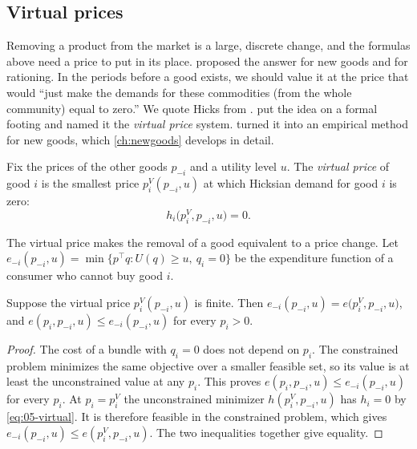 \subsection{Virtual prices}\label{sec:05-welfare-virtual}

Removing a product from the market is a large, discrete change, and the formulas above need a price to put in
its place. \citet{Hicks1940} proposed the answer for new goods and for rationing. In the periods before a good
exists, we should value it at the price that would ``just make the demands for these commodities (from the whole
community) equal to zero.'' We quote Hicks from \citet[p.~211]{Hausman1997}. \citet{Rothbarth1941} put the
idea on a formal footing and named it the \emph{virtual price} system. \citet{Hausman1997} turned it into an
empirical method for new goods, which \cref{ch:newgoods} develops in detail.

\begin{definition}\label{def:05-virtual}
Fix the prices of the other goods $p_{-i}$ and a utility level $u$. The \emph{virtual price} of good $i$ is the
smallest price $p_i^V(p_{-i},u)$ at which Hicksian demand for good $i$ is zero:
\begin{equation}\label{eq:05-virtual}
  h_i\bigl(p_i^V, p_{-i}, u\bigr) = 0.
\end{equation}
\end{definition}

The virtual price makes the removal of a good equivalent to a price change. Let
$e_{-i}(p_{-i},u) = \min\{p^\top q : U(q) \ge u,\ q_i = 0\}$ be the expenditure function of a consumer who
cannot buy good $i$.

\begin{proposition}\label{prop:05-removal}
Suppose the virtual price $p_i^V(p_{-i},u)$ is finite. Then
$e_{-i}(p_{-i},u) = e\bigl(p_i^V,p_{-i},u\bigr)$, and $e(p_i,p_{-i},u) \le e_{-i}(p_{-i},u)$ for every
$p_i > 0$.
\end{proposition}

\begin{proof}
The cost of a bundle with $q_i = 0$ does not depend on $p_i$. The constrained problem minimizes the same
objective over a smaller feasible set, so its value is at least the unconstrained value at any $p_i$. This
proves $e(p_i,p_{-i},u) \le e_{-i}(p_{-i},u)$ for every $p_i$. At $p_i = p_i^V$ the unconstrained minimizer
$h(p_i^V,p_{-i},u)$ has $h_i = 0$ by \eqref{eq:05-virtual}. It is therefore feasible in the constrained problem,
which gives $e_{-i}(p_{-i},u) \le e(p_i^V,p_{-i},u)$. The two inequalities together give equality.
\end{proof}

